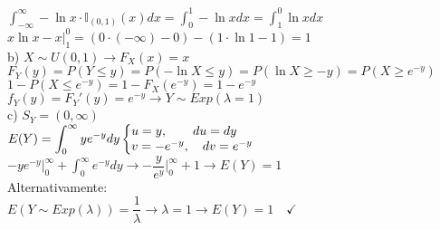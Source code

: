 \documentclass[12pt]{article}
\begin{document}
$\displaystyle\int_{-\infty}^{\infty}-\ln x\cdot\mathds{I}_{(0,1)}(x)dx=\int_{0}^{1}-\ln xdx=\int_{1}^{0}\ln xdx$\\

$x\ln x-x\biggr|_{1}^{0}=(0\cdot(-\infty)-0)-(1\cdot\ln 1-1)=1$\\

\noindent b) $X\sim U(0,1)\longrightarrow F_{X}(x)=x$\\

$F_{Y}(y)=P(Y\leq y)=P(-\ln X\leq y)=P(\ln X\geq -y)=P(X\geq e^{-y})$\\

$1-P(X\leq e^{-y})=1-F_{X}(e^{-y})=1-e^{-y}$\\

$f_{Y}(y)=F_{Y}'(y)=e^{-y}\longrightarrow Y\sim Exp(\lambda=1)$\\

\noindent c) $S_{Y}=(0,\infty)$\\

$E(Y)=\displaystyle\int_{0}^{\infty}ye^{-y}dy\hfill\left\{\begin{array}{@{}l@{}}u=y,\qquad du=dy\\v=-e^{-y},\quad dv=e^{-y}\end{array}\right.$\\

$\displaystyle -ye^{-y}\biggr|^{\infty}_{0}+\int_{0}^{\infty}e^{-y}dy\longrightarrow-\dfrac{y}{e^{y}}\biggr|^{\infty}_{0}+1\longrightarrow E(Y)=1$\\

Alternativamente:\\

$E\left(Y\sim Exp\left(\lambda\right)\right) = \dfrac{1}{\lambda}\longrightarrow\lambda=1\longrightarrow E(Y)=1\quad\checkmark$\\
\end{document}
